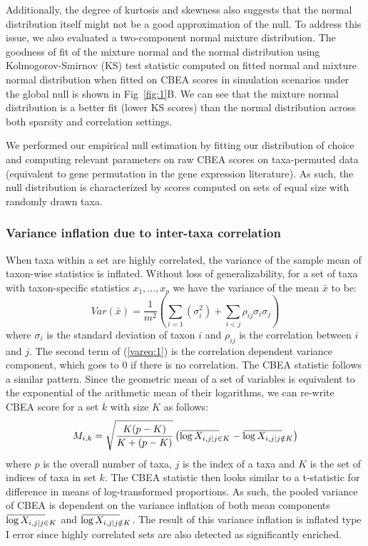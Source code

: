 \documentclass[10pt,letterpaper]{article}
\newcommand{\overbar}[1]{\mkern 2mu\overline{\mkern-2mu#1\mkern-20mu}\mkern 20mu}
\begin{document}
Additionally, the degree of kurtosis and skewness also suggests that the normal distribution itself might not be a good approximation of the null. To address this issue, we also evaluated a two-component normal mixture distribution. The goodness of fit of the mixture normal and the normal distribution using Kolmogorov-Smirnov (KS) test statistic computed on fitted normal and mixture normal distribution when fitted on CBEA scores in simulation scenarios under the global null is shown in Fig~\ref{fig:1}B. We can see that the mixture normal distribution is a better fit (lower KS scores) than the normal distribution across both sparsity and correlation settings. 

We performed our empirical null estimation by fitting our distribution of choice and computing relevant parameters on raw CBEA scores on taxa-permuted data (equivalent to gene permutation in the gene expression literature). As such, the null distribution is characterized by scores computed on sets of equal size with randomly drawn taxa. 

\subsubsection*{Variance inflation due to inter-taxa correlation}  
When taxa within a set are highly correlated, the variance of the sample mean of taxon-wise statistics is inflated. Without loss of generalizability, for a set of taxa with taxon-specific statistics $x_1, ..., x_p$ we have the variance of the mean $\bar{x}$ to be:  
\begin{equation} \label{vareq:1}
    Var(\bar{x}) = \frac{1}{m^2}\left(\sum_{i = 1}(\sigma_i^2) + \sum_{i < j}\rho_{ij}\sigma_i\sigma_j\right)
\end{equation}
where $\sigma_i$ is the standard deviation of taxon $i$ and $\rho_{ij}$ is the correlation between $i$ and $j$. The second term of (\ref{vareq:1}) is the correlation dependent variance component, which goes to 0 if there is no correlation. The CBEA statistic follows a similar pattern. Since the geometric mean of a set of variables is equivalent to the exponential of the arithmetic mean of their logarithms, we can re-write CBEA score for a set $k$ with size $K$ as follows:  
\begin{equation}\label{vareq:2}
    M_{i,k} = \sqrt{\frac{K(p - K)}{K + (p - K)}} \left( \overbar{\log{X_{i,j|j \in K}}} - \overbar{\log{X_{i,j|j \notin K}}} \right)   
\end{equation}
where $p$ is the overall number of taxa, $j$ is the index of a taxa and $K$ is the set of indices of taxa in set $k$. The CBEA statistic then looks similar to a t-statistic for difference in means of log-transformed proportions. As such, the pooled variance of CBEA is dependent on the variance inflation of both mean components $\overbar{\log{X_{i,j|j \in K}}}$ and $\overbar{\log{X_{i,j|j \notin K}}}$. The result of this variance inflation is inflated type I error since highly correlated sets are also detected as significantly enriched. 
\end{document}
